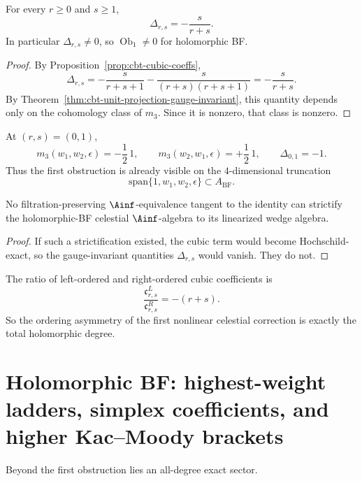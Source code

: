 \begin{theorem}
For every $r\ge0$ and $s\ge1$,
\[
\Delta_{r,s}=-\frac{s}{r+s}.
\]
In particular $\Delta_{r,s}\neq0$, so $\operatorname{Ob}_1\neq0$ for holomorphic BF.
\end{theorem}

\begin{proof}
By Proposition~\ref{prop:cbt-cubic-coeffs},
\[
\Delta_{r,s}
=
-\frac{s}{r+s+1}-\frac{s}{(r+s)(r+s+1)}
=
-\frac{s}{r+s}.
\]
By Theorem~\ref{thm:cbt-unit-projection-gauge-invariant}, this quantity depends only on the cohomology class of $m_3$. Since it is nonzero, that class is nonzero.
\end{proof}

\begin{corollary}
At $(r,s)=(0,1)$,
\[
m_3(w_1,w_2,\epsilon)=-\frac12\,1,
\qquad
m_3(w_2,w_1,\epsilon)=+\frac12\,1,
\qquad
\Delta_{0,1}=-1.
\]
Thus the first obstruction is already visible on the $4$-dimensional truncation
\[
\mathrm{span}\{1,w_1,w_2,\epsilon\}\subset A_{\mathrm{BF}}.
\]
\end{corollary}

\begin{corollary}
No filtration-preserving $\Ainf$-equivalence tangent to the identity can strictify the holomorphic-BF celestial $\Ainf$-algebra to its linearized wedge algebra.
\end{corollary}

\begin{proof}
If such a strictification existed, the cubic term would become Hochschild-exact, so the gauge-invariant quantities $\Delta_{r,s}$ would vanish. They do not.
\end{proof}

\begin{corollary}
The ratio of left-ordered and right-ordered cubic coefficients is
\[
\frac{\mathfrak c^L_{r,s}}{\mathfrak c^R_{r,s}}=-(r+s).
\]
So the ordering asymmetry of the first nonlinear celestial correction is exactly the total holomorphic degree.
\end{corollary}

\section{Holomorphic BF: highest-weight ladders, simplex coefficients, and higher Kac--Moody brackets}

Beyond the first obstruction lies an all-degree exact sector.

